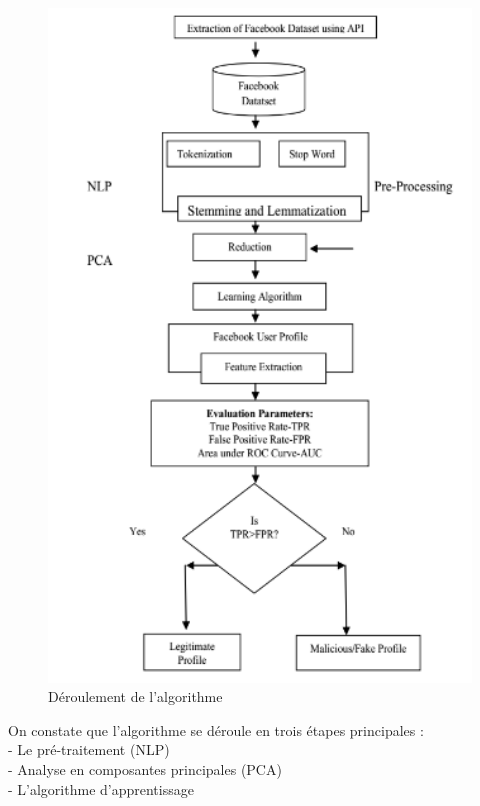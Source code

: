 \documentclass[12pt]{report}
\begin{document}
\begin{figure}
\begin{center}
    \includegraphics[width=130mm]{DeroulementAlgo.PNG}
    \end{center}
    \caption{Déroulement de l'algorithme}
\label{fig:Déroulement de l'algorithme}
  \end{figure}

\newpage
On constate que l'algorithme se déroule en trois étapes principales : \\
- Le pré-traitement (NLP) \\
- Analyse en composantes principales (PCA) \\
- L'algorithme d'apprentissage \\
\end{document}
